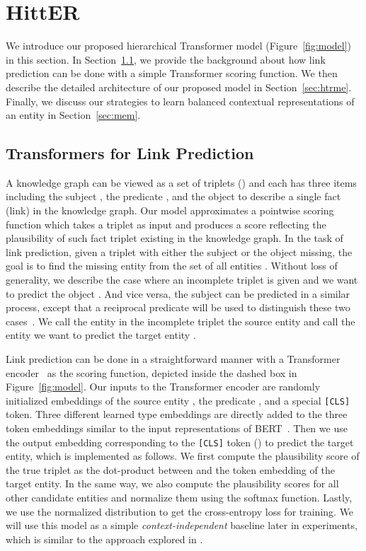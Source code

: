 \documentclass[11pt]{article}
\newcommand{\hit}{HittER\xspace}
\begin{document}
%
 \section{\hit}
\label{sec:methodology}

We introduce our proposed hierarchical Transformer model (Figure~\ref{fig:model}) in this section. In Section~\ref{sec:link_pred}, we provide the background about how link prediction can be done with a simple Transformer scoring function. We then describe the detailed architecture of our proposed model in Section~\ref{sec:htrme}. Finally, we discuss our strategies to learn balanced contextual representations of an entity in Section~\ref{sec:mem}.

\subsection{Transformers for Link Prediction}
\label{sec:link_pred}

A knowledge graph can be viewed as a set of triplets () and each has three items including the subject , the predicate , and the object  to describe a single fact (link) in the knowledge graph. Our model approximates a pointwise scoring function  which takes a triplet as input and produces a score reflecting the plausibility of such fact triplet existing in the knowledge graph.
In the task of link prediction, given a triplet with either the subject or the object missing, the goal is to find the missing entity from the set of all entities .
Without loss of generality, we describe the case where an incomplete triplet  is given and we want to predict the object .
And vice versa, the subject  can be predicted in a similar process, except that a reciprocal predicate  will be used to distinguish these two cases~\cite{lacroix2018canonical}.
We call the entity in the incomplete triplet the source entity  and call the entity we want to predict the target entity .

Link prediction can be done in a straightforward manner with a Transformer encoder~\cite{vaswani2017attention} as the scoring function, depicted inside the dashed box in Figure~\ref{fig:model}.
Our inputs to the Transformer encoder are randomly initialized embeddings of the source entity , the predicate , and a special \texttt{[CLS]} token.
Three different learned type embeddings are directly added to the three token embeddings similar to the input representations of BERT~\cite{devlin-etal-2019-bert}.
Then we use the output embedding corresponding to the \texttt{[CLS]} token () to predict the target entity, which is implemented as follows.
We first compute the plausibility score of the true triplet as the dot-product between  and the token embedding of the target entity.
In the same way, we also compute the plausibility scores for all other candidate entities and normalize them using the softmax function. 
Lastly, we use the normalized distribution to get the cross-entropy loss  for training.
We will use this model as a simple \emph{context-independent} baseline later in experiments, which is similar to the approach explored in \citet{wang2019coke}.
\end{document}
